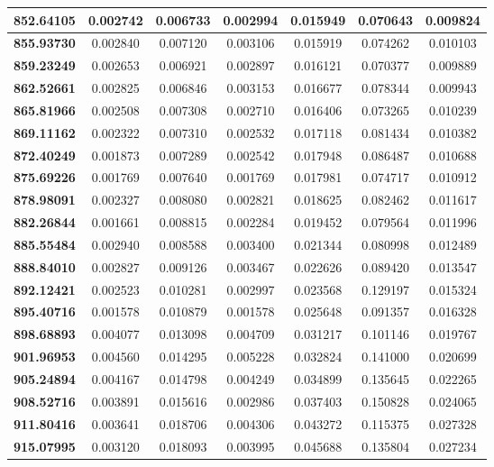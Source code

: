 \documentclass[10pt, a4paper]{article}
\begin{document}
\begin{appendices}
\begin{longtable}{|c|c|c|c|c|c|c|}
	\textbf{852.64105} & 0.002742 & 0.006733 & 0.002994 & 0.015949 & 0.070643 & 0.009824 \\ \hline
	\textbf{855.93730} & 0.002840 & 0.007120 & 0.003106 & 0.015919 & 0.074262 & 0.010103 \\ \hline
	\textbf{859.23249} & 0.002653 & 0.006921 & 0.002897 & 0.016121 & 0.070377 & 0.009889 \\ \hline
	\textbf{862.52661} & 0.002825 & 0.006846 & 0.003153 & 0.016677 & 0.078344 & 0.009943 \\ \hline
	\textbf{865.81966} & 0.002508 & 0.007308 & 0.002710 & 0.016406 & 0.073265 & 0.010239 \\ \hline
	\textbf{869.11162} & 0.002322 & 0.007310 & 0.002532 & 0.017118 & 0.081434 & 0.010382 \\ \hline
	\textbf{872.40249} & 0.001873 & 0.007289 & 0.002542 & 0.017948 & 0.086487 & 0.010688 \\ \hline
	\textbf{875.69226} & 0.001769 & 0.007640 & 0.001769 & 0.017981 & 0.074717 & 0.010912 \\ \hline
	\textbf{878.98091} & 0.002327 & 0.008080 & 0.002821 & 0.018625 & 0.082462 & 0.011617 \\ \hline
	\textbf{882.26844} & 0.001661 & 0.008815 & 0.002284 & 0.019452 & 0.079564 & 0.011996 \\ \hline
	\textbf{885.55484} & 0.002940 & 0.008588 & 0.003400 & 0.021344 & 0.080998 & 0.012489 \\ \hline
	\textbf{888.84010} & 0.002827 & 0.009126 & 0.003467 & 0.022626 & 0.089420 & 0.013547 \\ \hline
	\textbf{892.12421} & 0.002523 & 0.010281 & 0.002997 & 0.023568 & 0.129197 & 0.015324 \\ \hline
	\textbf{895.40716} & 0.001578 & 0.010879 & 0.001578 & 0.025648 & 0.091357 & 0.016328 \\ \hline
	\textbf{898.68893} & 0.004077 & 0.013098 & 0.004709 & 0.031217 & 0.101146 & 0.019767 \\ \hline
	\textbf{901.96953} & 0.004560 & 0.014295 & 0.005228 & 0.032824 & 0.141000 & 0.020699 \\ \hline
	\textbf{905.24894} & 0.004167 & 0.014798 & 0.004249 & 0.034899 & 0.135645 & 0.022265 \\ \hline
	\textbf{908.52716} & 0.003891 & 0.015616 & 0.002986 & 0.037403 & 0.150828 & 0.024065 \\ \hline
	\textbf{911.80416} & 0.003641 & 0.018706 & 0.004306 & 0.043272 & 0.115375 & 0.027328 \\ \hline
	\textbf{915.07995} & 0.003120 & 0.018093 & 0.003995 & 0.045688 & 0.135804 & 0.027234 \\ \hline

\end{longtable}
\end{appendices}
\end{document}
